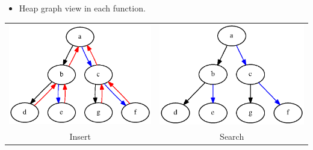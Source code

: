 \documentclass[mathserif,10pt]{beamer}
\begin{document}
\frame
{
  \begin{itemize}
   \item Heap graph view in each function. \\
  \end{itemize}
    
    \begin{table}
    \begin{tabular}{cc}
     \includegraphics[scale=0.4]{tree.eps}  & \includegraphics[scale=0.4]{tree1.eps}  \\
     Insert & Search      
    \end{tabular}
    \end{table}
  
}
\end{document}
